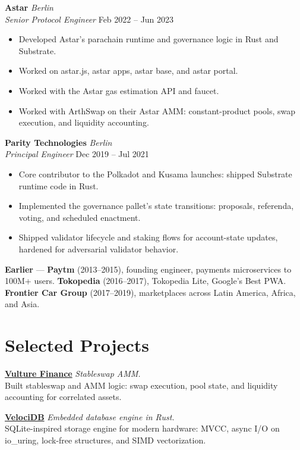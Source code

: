\documentclass[10pt,a4paper]{article}
\newcommand{\role}[4]{%
    \textbf{#1} \hfill {\color{muted}\textit{#4}}\\
    {\color{primary}\textit{#2}} \hfill {\color{muted}\small #3}\\
    \vspace{-2pt}
}
\newenvironment{bullets}{%
  \begin{itemize}[leftmargin=14pt, itemsep=0.5pt, parsep=0pt, topsep=1pt]%
}{\end{itemize}}
\begin{document}
\role{Astar}{Senior Protocol Engineer}{Feb 2022 -- Jun 2023}{Berlin}
\begin{bullets}
    \item Developed Astar's parachain runtime and governance logic in Rust and Substrate.
    \item Worked on astar.js, astar apps, astar base, and astar portal.
    \item Worked with the Astar gas estimation API and faucet.
    \item Worked with ArthSwap on their Astar AMM: constant-product pools, swap execution, and liquidity accounting.
\end{bullets}

\role{Parity Technologies}{Principal Engineer}{Dec 2019 -- Jul 2021}{Berlin}
\begin{bullets}
    \item Core contributor to the Polkadot and Kusama launches: shipped Substrate runtime code in Rust.
    \item Implemented the governance pallet's state transitions: proposals, referenda, voting, and scheduled enactment.
    \item Shipped validator lifecycle and staking flows for account-state updates, hardened for adversarial validator behavior.
\end{bullets}

\vspace{3pt}
{\color{muted}\textbf{Earlier}} ---
\textbf{Paytm} (2013--2015), founding engineer, payments microservices to 100M+ users.
\textbf{Tokopedia} (2016--2017), Tokopedia Lite, Google's Best PWA.
\textbf{Frontier Car Group} (2017--2019), marketplaces across Latin America, Africa, and Asia.

\section{Selected Projects}

\textbf{\href{https://vulture.finance}{Vulture Finance}} \hfill \textit{Stableswap AMM.}\\
Built stableswap and AMM logic: swap execution, pool state, and liquidity accounting for correlated assets.

\vspace{2pt}
\textbf{\href{https://github.com/niklabh/velocidb}{VelociDB}} \hfill \textit{Embedded database engine in Rust.}\\
SQLite-inspired storage engine for modern hardware: MVCC, async I/O on io\_uring, lock-free structures, and SIMD vectorization.
\end{document}
